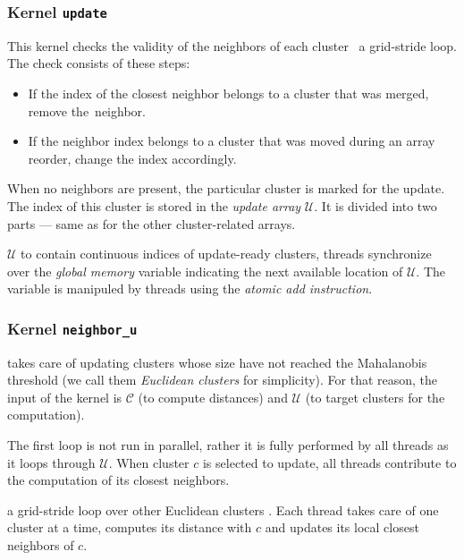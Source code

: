\subsubsection{Kernel \texttt{update}}
This kernel checks the validity of the neighbors of each cluster \ a grid-stride loop. The check consists of these steps:
\begin{itemize}
	\item If the index of the closest neighbor belongs to a cluster that was merged, remove the~neighbor.
	\item If the neighbor index belongs to a cluster that was moved during an array reorder, change the index accordingly.
\end{itemize} 
When no neighbors are present, the particular cluster is marked for the update. The index of this cluster is stored in the \emph{update array} $\mathcal{U}$. It is divided into two parts --- same as for the other cluster-related arrays. 

$\mathcal{U}$ to contain continuous indices of update-ready clusters, threads synchronize over the \emph{global memory} variable indicating the next available location of $\mathcal{U}$. The variable is manipuled by threads using the \emph{atomic add instruction}.

\subsubsection{Kernel \texttt{neighbor\_u}}

 takes care of updating clusters whose size have not reached the Mahalanobis threshold (we call them \emph{Euclidean clusters} for simplicity). For that reason, the input of the kernel is $\mathcal{C}$ (to compute distances) and $\mathcal{U}$ (to target clusters for the computation).

The first loop is not run in parallel, rather it is fully performed by all threads as it loops through $\mathcal{U}$. When cluster $c$ is selected to update, all threads contribute to the computation of its closest neighbors.

 a grid-stride loop over other Euclidean clusters . Each thread takes care of one cluster at a time, computes its distance with $c$ and updates its local closest neighbors of $c$.

